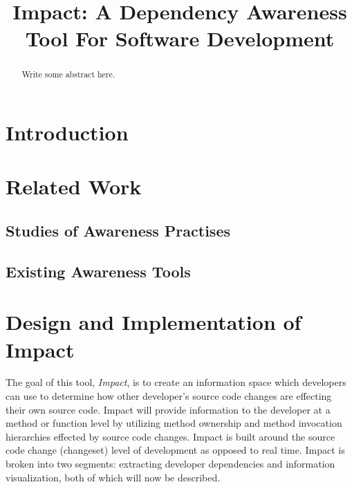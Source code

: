 \documentclass[conference]{IEEEtran}
\begin{document}
\title{Impact: A Dependency Awareness Tool For Software Development}

\author{
\and
{}
}

\maketitle

\begin{abstract}
Write some abstract here.
\end{abstract}


\section{Introduction}



\section{Related Work}

\subsection{Studies of Awareness Practises}

\subsection{Existing Awareness Tools}


\section{Design and Implementation of Impact}
The goal of this tool, \textit{Impact}, is to create an information space which
developers can use to determine how other developer's source code changes are
effecting their own source code. Impact will provide information to the 
developer at a method or function level by utilizing method ownership and
method invocation hierarchies effected by source code changes. 
Impact is built around the source code change (changeset) level of development
as opposed to real time. Impact is broken
into two segments: extracting developer dependencies and information
visualization, both of which will now be described.\\
\end{document}

